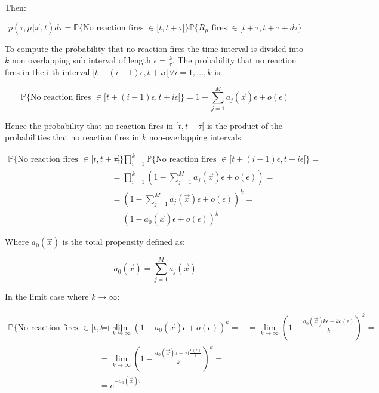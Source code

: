     Then:

    $$p(\tau, \mu|\vec{x}, t) d\tau = \mathbb{P}\{\text{No reaction fires }\in[t,t+\tau[\}\mathbb{P}\{R_\mu\text{ fires }\in[t+\tau, t+\tau+d\tau\}$$

    To compute the probability that no reaction fires the time interval is divided into $k$ non overlapping sub interval of length $\epsilon = \frac{k}{\tau}$.
    The probability that no reaction fires in the i-th interval $[t+(i-1)\epsilon, t+i\epsilon[\forall i=1,\dots,k$ is:

    $$\mathbb{P}\{\text{No reaction fires }\in[t+(i-1)\epsilon, t+i\epsilon[\} = 1-\sum\limits_{j=1}^Ma_j(\vec{x})\epsilon+o(\epsilon)$$

    Hence the probability that no reaction fires in $[t, t+\tau[$ is the product of the probabilities that no reaction fires in $k$ non-overlapping intervals:

    \begin{align*}
      \mathbb{P}\{\text{No reaction fires }\in[t,t+\tau[\} &= \prod\limits_{i=1}^k\mathbb{P}\{\text{No reaction fires }\in[t+(i-1)\epsilon, t+i\epsilon[\}=\\
                                                           &=\prod\limits_{i=1}^k\left(1-\sum\limits_{j=1}^Ma_j(\vec{x})\epsilon+o(\epsilon)\right)=\\
                                                           &=\left(1-\sum\limits_{j=1}^Ma_j(\vec{x})\epsilon+o(\epsilon)\right)^k=\\
                                                           &=(1-a_0(\vec{x})\epsilon+o(\epsilon))^k
    \end{align*}

    Where $a_0(\vec{x})$ is the total propensity defined as:

    $$a_0(\vec{x}) = \sum\limits_{j=1}^Ma_j(\vec{x})$$

    In the limit case where $k\rightarrow\infty$:

    \begin{align*}
      \mathbb{P}\{\text{No reaction fires }\in[t,t+\tau[\} &= \lim\limits_{k\rightarrow\infty}(1-a_0(\vec{x})\epsilon+o(\epsilon))^k =
                                                           &=\lim\limits_{k\rightarrow\infty}\left(1-\frac{a_0(\vec{x})k\epsilon+ko(\epsilon)}{k}\right)^k=\\
                                                           &=\lim\limits_{k\rightarrow\infty}\left(1-\frac{a_0(\vec{x})\tau+\tau(\frac{o(\epsilon)}{\epsilon}}{k}\right)^k=\\
                                                           &=e^{-a_0(\vec{x})\tau}
    \end{align*}

